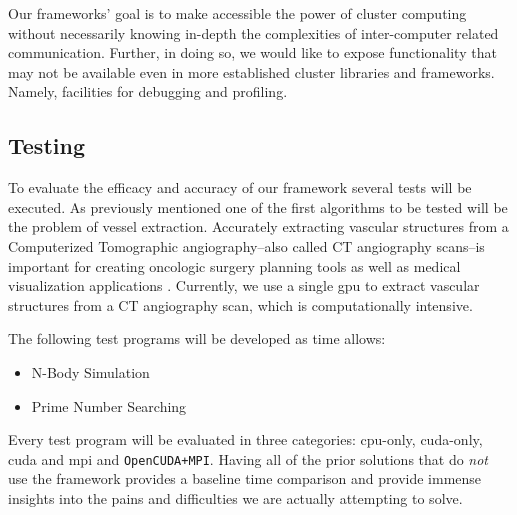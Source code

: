 Our frameworks' goal is to make accessible the power of \gls{cluster} computing
without necessarily knowing in-depth the complexities of inter-computer related
communication. Further, in doing so, we would like to expose functionality that
may not be available even in more established \gls{cluster} libraries and
frameworks. Namely, facilities for debugging and profiling.

\subsection{Testing}

To evaluate the efficacy and accuracy of our framework several tests will be
executed. As previously mentioned one of the first algorithms to be tested will
be the problem of vessel extraction. Accurately extracting vascular structures
from a Computerized Tomographic angiography--also called CT angiography
scans--is important for creating oncologic surgery planning tools as well as
medical visualization applications \cite{erdt2008automatic}.  Currently, we use
a single \gls{gpu} to extract vascular structures from a CT angiography scan,
which is computationally intensive.

The following test programs will be developed as time allows:

\begin{itemize}
    \item N-Body Simulation
    \item Prime Number Searching
\end{itemize}

Every test program will be evaluated in three categories: \gls{cpu}-only,
\gls{cuda}-only, \gls{cuda} and \gls{mpi} and \texttt{OpenCUDA+MPI}. Having all
of the prior solutions that do \emph{not} use the framework provides a baseline
time comparison and provide immense insights into the pains and difficulties we
are actually attempting to solve.
